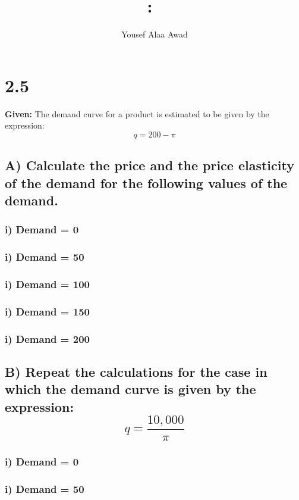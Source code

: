 \documentclass{article}
\title{
    \vspace{2in}
    \textmd{\textbf{\hmwkClass:\ \hmwkTitle}}\\
    \normalsize\vspace{0.1in}
    \vspace{3in}
}
\author{Yousef Alaa Awad}
\begin{document}
\maketitle
\pagebreak

\section{2.5}
\textbf{Given:}  The demand curve for a product is estimated to be given by the expression: $$ q = 200 - \pi $$

\subsection{A) Calculate the price and the price elasticity of the demand for the following values of the demand.}

\subsubsection{i) Demand = 0}

\subsubsection{i) Demand = 50}

\subsubsection{i) Demand = 100}

\subsubsection{i) Demand = 150}

\subsubsection{i) Demand = 200}

\subsection{B) Repeat the calculations for the case in which the demand curve is given by the expression: $$ q = \frac{10,000}{\pi} $$}

\subsubsection{i) Demand = 0}

\subsubsection{i) Demand = 50}
\end{document}
